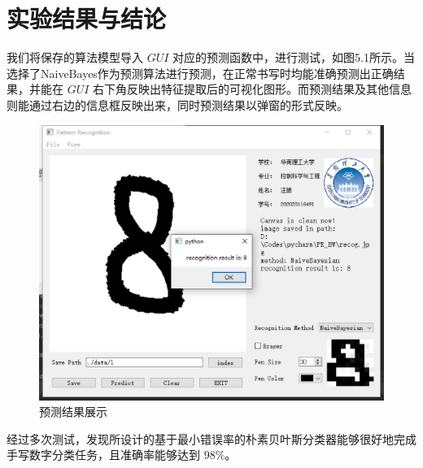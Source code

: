 \documentclass[UTF8, a4paper, 12pt]{report}
\begin{document}
\chapter{实验结果与结论}
		我们将保存的算法模型导入 $GUI$ 对应的预测函数中，进行测试，如图5.1所示。当选择了NaiveBayes作为预测算法进行预测，在正常书写时均能准确预测出正确结果，并能在 $GUI$ 右下角反映出特征提取后的可视化图形。而预测结果及其他信息则能通过右边的信息框反映出来，同时预测结果以弹窗的形式反映。
		\begin{figure}[!h]
		\centering
		\includegraphics[scale=0.5]{./img/Predict.eps}
		\caption{预测结果展示}
		\label{fig:5.1}
		\end{figure}

		经过多次测试，发现所设计的基于最小错误率的朴素贝叶斯分类器能够很好地完成手写数字分类任务，且准确率能够达到 $98\%$。
\clearpage
\end{document}

